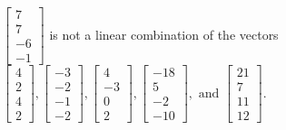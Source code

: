 \begin{exercise}
\begin{exerciseStatement}
  \end{exerciseStatement}
  \begin{exerciseAnswer}
   \(\left[\begin{array}{c}
7 \\
7 \\
-6 \\
-1
\end{array}\right]\) 
  	 is not  
	a linear combination of the vectors \(\left[\begin{array}{c}
4 \\
2 \\
4 \\
2
\end{array}\right] , \left[\begin{array}{c}
-3 \\
-2 \\
-1 \\
-2
\end{array}\right] , \left[\begin{array}{c}
4 \\
-3 \\
0 \\
2
\end{array}\right] , \left[\begin{array}{c}
-18 \\
5 \\
-2 \\
-10
\end{array}\right] , \text{ and } \left[\begin{array}{c}
21 \\
7 \\
11 \\
12
\end{array}\right]\).

	
  


  \end{exerciseAnswer}
\end{exercise}